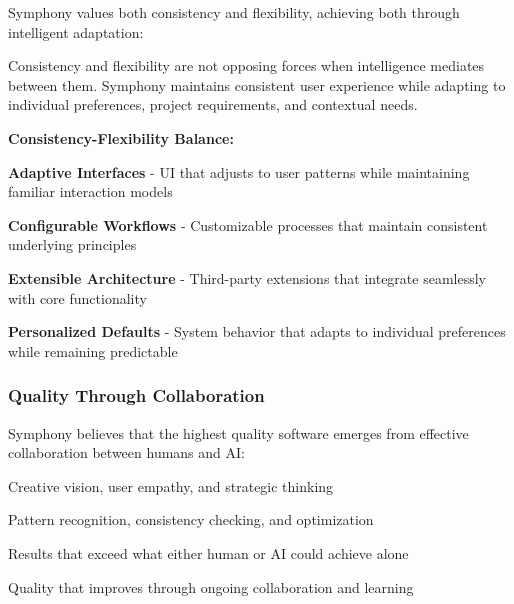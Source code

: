 Symphony values both consistency and flexibility, achieving both through intelligent adaptation:

\begin{successbox}
Consistency and flexibility are not opposing forces when intelligence mediates between them. Symphony maintains consistent user experience while adapting to individual preferences, project requirements, and contextual needs.
\end{successbox}

\textbf{Consistency-Flexibility Balance:}

\begin{compactlist}
    \item \textbf{Adaptive Interfaces} - UI that adjusts to user patterns while maintaining familiar interaction models
    \item \textbf{Configurable Workflows} - Customizable processes that maintain consistent underlying principles
    \item \textbf{Extensible Architecture} - Third-party extensions that integrate seamlessly with core functionality
    \item \textbf{Personalized Defaults} - System behavior that adapts to individual preferences while remaining predictable
\end{compactlist}

\subsubsection{Quality Through Collaboration}

Symphony believes that the highest quality software emerges from effective collaboration between humans and AI:

\begin{description}[leftmargin=3.5cm,labelwidth=3cm]
    \item[\textbf{Human Insight}] Creative vision, user empathy, and strategic thinking
    
    \item[\textbf{AI Capability}] Pattern recognition, consistency checking, and optimization
    
    \item[\textbf{Collaborative Quality}] Results that exceed what either human or AI could achieve alone
    
    \item[\textbf{Continuous Improvement}] Quality that improves through ongoing collaboration and learning
\end{description}

